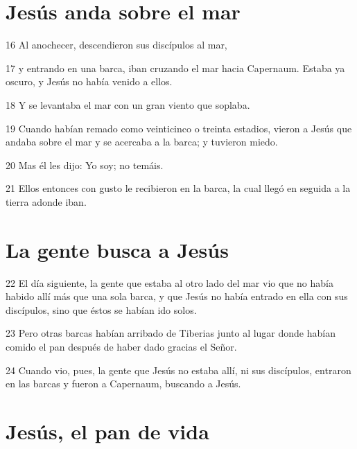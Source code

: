 \section*{Jesús anda sobre el mar}

\par 16 Al anochecer, descendieron sus discípulos al mar,
\par 17 y entrando en una barca, iban cruzando el mar hacia Capernaum. Estaba ya oscuro, y Jesús no había venido a ellos.
\par 18 Y se levantaba el mar con un gran viento que soplaba.
\par 19 Cuando habían remado como veinticinco o treinta estadios, vieron a Jesús que andaba sobre el mar y se acercaba a la barca; y tuvieron miedo.
\par 20 Mas él les dijo: Yo soy; no temáis.
\par 21 Ellos entonces con gusto le recibieron en la barca, la cual llegó en seguida a la tierra adonde iban.

\section*{La gente busca a Jesús}

\par 22 El día siguiente, la gente que estaba al otro lado del mar vio que no había habido allí más que una sola barca, y que Jesús no había entrado en ella con sus discípulos, sino que éstos se habían ido solos.
\par 23 Pero otras barcas habían arribado de Tiberias junto al lugar donde habían comido el pan después de haber dado gracias el Señor.
\par 24 Cuando vio, pues, la gente que Jesús no estaba allí, ni sus discípulos, entraron en las barcas y fueron a Capernaum, buscando a Jesús.

\section*{Jesús, el pan de vida}

